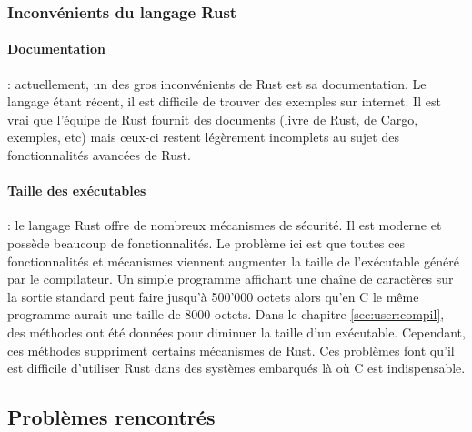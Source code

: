 \documentclass[a4paper, 12pt]{article}
\begin{document}
\subsubsection{Inconvénients du langage Rust}
\paragraph{Documentation} :
actuellement, un des gros inconvénients de Rust est sa documentation. Le langage
étant récent, il est difficile de trouver des exemples sur internet. Il est vrai
que l'équipe de Rust fournit des documents (livre de Rust, de Cargo, exemples, etc)
mais ceux-ci restent légèrement incomplets au sujet des fonctionnalités avancées
de Rust.

\paragraph{Taille des exécutables} :
le langage Rust offre de nombreux mécanismes de sécurité. Il est moderne et possède
beaucoup de fonctionnalités. Le problème ici est que toutes ces fonctionnalités
et mécanismes viennent augmenter la taille de l'exécutable généré par le compilateur.
Un simple programme affichant une chaîne de caractères sur la sortie standard peut
faire jusqu'à 500'000 octets alors qu'en C le même programme aurait une taille de
8000 octets. Dans le chapitre \ref{sec:user:compil}, des méthodes ont été
données pour diminuer la taille d'un exécutable. Cependant, ces méthodes suppriment
certains mécanismes de Rust. Ces problèmes font qu'il est difficile d'utiliser
Rust dans des systèmes embarqués là où C est indispensable.


\newpage
\subsection{Problèmes rencontrés}
\end{document}
